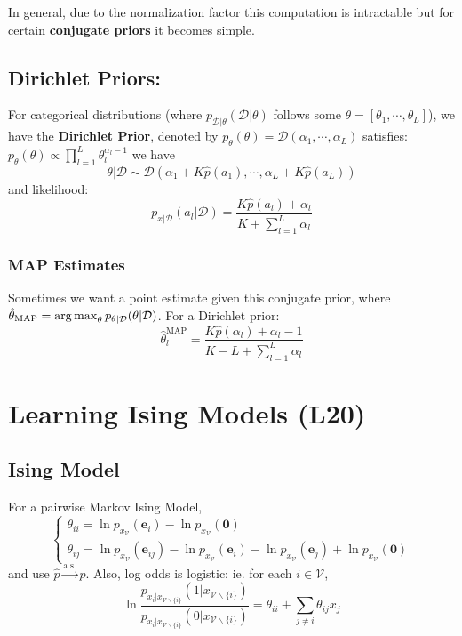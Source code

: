 \documentclass[9pt]{article}
\begin{document}
\begin{multicols}{2}
In general, due to the normalization factor this computation is
intractable but for certain \textbf{conjugate priors} it becomes
simple. 

\subsection{Dirichlet Priors:} For categorical distributions (where
$p_{\mathcal{D}|\theta}(\mathcal{D}|\theta)$ follows some $\theta=[\theta_1,\cdots,\theta_{L}]$), we have the \textbf{Dirichlet Prior}, denoted by $p_{\theta}(\theta)=\mathcal{D}(\alpha_1,\cdots,\alpha_L)$ satisfies: $p_{\theta}(\theta) \propto \prod\limits_{l=1}^{L}\theta_{l}^{\alpha_l-1}$ we have
$$\theta|\mathcal{D} \sim \mathcal{D}(\alpha_1+K\hat{p}(a_1),\cdots,\alpha_L+K\hat{p}(a_{L}))$$ 
and likelihood:
$$p_{x|\mathcal{D}}(a_{l}|\mathcal{D})=\frac{K\hat{p}(a_l)+\alpha_l}{K+\sum_{l=1}^{L}\alpha_{l}}$$

\subsubsection{MAP Estimates}
Sometimes we want a point estimate given this conjugate prior, where
$\hat\theta_{\text{MAP}}=\operatorname*{arg\,max}_{\theta} p_{\theta|\mathcal{D}}(\theta|\mathcal{D})$. For a Dirichlet prior:
$$\hat\theta_{l}^{\text{MAP}}=\frac{K\hat p(\alpha_l)+\alpha_l-1}{K-L+\sum_{l=1}^{L}\alpha_l}$$

\section{Learning Ising Models (L20)}

\subsection{Ising Model}
For a pairwise Markov Ising Model, 
$$\begin{cases} \theta_{ii} = \ln p_{x_{\mathcal{V}}}(\mathbf{e}_i)-\ln p_{x_{\mathcal{V}}}(\mathbf{0}) \\
\theta_{ij}=\ln p_{x_{\mathcal{V}}}(\mathbf{e}_{ij})-
\ln p_{x_{\mathcal{V}}}(\mathbf{e}_i)-\ln p_{x_{\mathcal{V}}}(\mathbf{e}_j)+\ln p_{x_\mathcal{V}}(\mathbf{0})\end{cases}$$
and use $\hat{p} \xrightarrow{\text{a.s.}} p$. Also, log odds is
logistic: ie. for each $i \in \mathcal{V}$, 
$$\ln\frac{p_{x_i|x_{\mathcal{V}\backslash\{i\}}}(1|x_{\mathcal{V}\backslash\{i\}})}{p_{x_i|x_{\mathcal{V}\backslash\{i\}}}(0|x_{\mathcal{V}\backslash\{i\}})}=\theta_{ii}+\sum_{j \ne i} \theta_{ij}x_{j}$$


\end{multicols}
\end{document}
